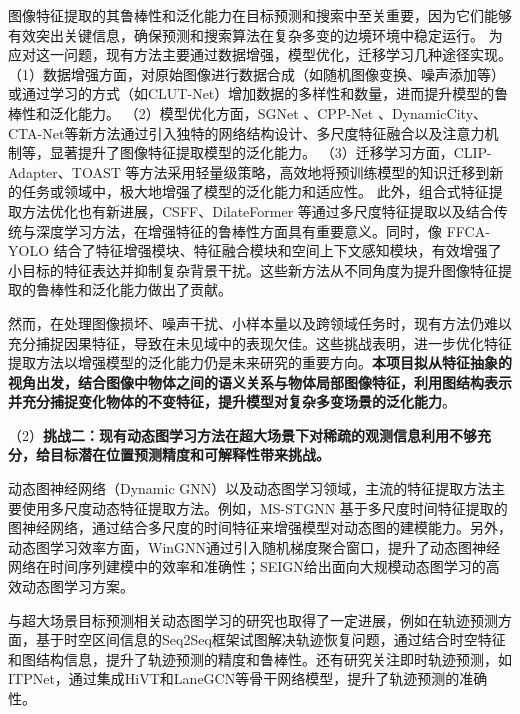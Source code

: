 图像特征提取的其鲁棒性和泛化能力在目标预测和搜索中至关重要，因为它们能够有效突出关键信息，确保预测和搜索算法在复杂多变的边境环境中稳定运行。
为应对这一问题，现有方法主要通过数据增强，模型优化，迁移学习几种途径实现。
（1）数据增强方面，对原始图像进行数据合成（如随机图像变换\cite{cubuk2020randaugment}、噪声添加\cite{chowdhury2025r}等）或通过学习的方式（如CLUT-Net\cite{mei2022clut}）增加数据的多样性和数量，进而提升模型的鲁棒性和泛化能力。
（2）模型优化方面，SGNet \cite{liu2021sg}、CPP-Net \cite{guo2024cpp} 、DynamicCity\cite{dynamiccity2025}、CTA-Net\cite{Meng2024CTA-Net}等新方法通过引入独特的网络结构设计、多尺度特征融合以及注意力机制等，显著提升了图像特征提取模型的泛化能力。
（3）迁移学习方面，CLIP-Adapter\cite{gao2021clip}、TOAST\cite{shi2023toast} 等方法采用轻量级策略，高效地将预训练模型的知识迁移到新的任务或领域中，极大地增强了模型的泛化能力和适应性。
此外，组合式特征提取方法优化也有新进展，CSFF\cite{cheng2020cross}、DilateFormer\cite{jiao2023dilateformer} 等通过多尺度特征提取以及结合传统与深度学习方法，在增强特征的鲁棒性方面具有重要意义。同时，像 FFCA-YOLO \cite{yin2024ffca} 结合了特征增强模块、特征融合模块和空间上下文感知模块，有效增强了小目标的特征表达并抑制复杂背景干扰。这些新方法从不同角度为提升图像特征提取的鲁棒性和泛化能力做出了贡献。

然而，在处理图像损坏、噪声干扰、小样本量以及跨领域任务时，现有方法仍难以充分捕捉因果特征，导致在未见域中的表现欠佳。这些挑战表明，进一步优化特征提取方法以增强模型的泛化能力仍是未来研究的重要方向。\textbf{本项目拟从特征抽象的视角出发，结合图像中物体之间的语义关系与物体局部图像特征，利用图结构表示并充分捕捉变化物体的不变特征，提升模型对复杂多变场景的泛化能力}。

（2）\textbf{挑战二：现有动态图学习方法在超大场景下对稀疏的观测信息利用不够充分，给目标潜在位置预测精度和可解释性带来挑战。}

动态图神经网络（Dynamic GNN）以及动态图学习领域，主流的特征提取方法主要使用多尺度动态特征提取方法。例如，MS-STGNN \cite{wang2023multi}基于多尺度时间特征提取的图神经网络，通过结合多尺度的时间特征来增强模型对动态图的建模能力。另外，动态图学习效率方面，WinGNN\cite{zhu2023wingnn}通过引入随机梯度聚合窗口，提升了动态图神经网络在时间序列建模中的效率和准确性；SEIGN给出面向大规模动态图学习的高效动态图学习方案。

与超大场景目标预测相关动态图学习的研究也取得了一定进展，例如在轨迹预测方面，基于时空区间信息的Seq2Seq\cite{Seq2SeqTrajRec}框架试图解决轨迹恢复问题，通过结合时空特征和图结构信息，提升了轨迹预测的精度和鲁棒性。还有研究关注即时轨迹预测，如ITPNet\cite{ITPNet}，通过集成HiVT\cite{zhou2022hivt}和LaneGCN\cite{liang2020learning}等骨干网络模型，提升了轨迹预测的准确性。

